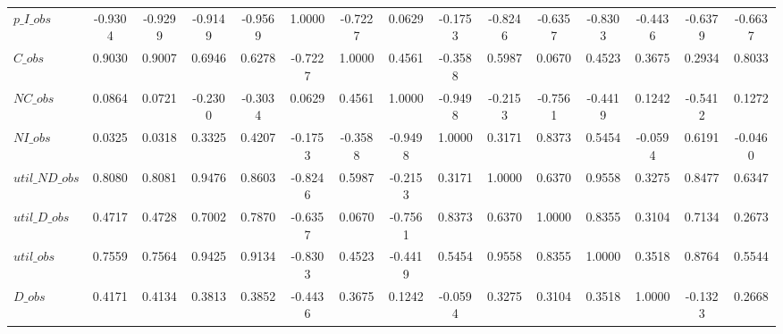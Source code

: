 \begin{center}
\begin{longtable}{lcccccccccccccc}
$p\_I\_obs      $	 & 	          -0.9304	 & 	          -0.9299	 & 	          -0.9149	 & 	          -0.9569	 & 	           1.0000	 & 	          -0.7227	 & 	           0.0629	 & 	          -0.1753	 & 	          -0.8246	 & 	          -0.6357	 & 	          -0.8303	 & 	          -0.4436	 & 	          -0.6379	 & 	          -0.6637 \\ 
$C\_obs         $	 & 	           0.9030	 & 	           0.9007	 & 	           0.6946	 & 	           0.6278	 & 	          -0.7227	 & 	           1.0000	 & 	           0.4561	 & 	          -0.3588	 & 	           0.5987	 & 	           0.0670	 & 	           0.4523	 & 	           0.3675	 & 	           0.2934	 & 	           0.8033 \\ 
$NC\_obs        $	 & 	           0.0864	 & 	           0.0721	 & 	          -0.2300	 & 	          -0.3034	 & 	           0.0629	 & 	           0.4561	 & 	           1.0000	 & 	          -0.9498	 & 	          -0.2153	 & 	          -0.7561	 & 	          -0.4419	 & 	           0.1242	 & 	          -0.5412	 & 	           0.1272 \\ 
$NI\_obs        $	 & 	           0.0325	 & 	           0.0318	 & 	           0.3325	 & 	           0.4207	 & 	          -0.1753	 & 	          -0.3588	 & 	          -0.9498	 & 	           1.0000	 & 	           0.3171	 & 	           0.8373	 & 	           0.5454	 & 	          -0.0594	 & 	           0.6191	 & 	          -0.0460 \\ 
$util\_ND\_obs  $	 & 	           0.8080	 & 	           0.8081	 & 	           0.9476	 & 	           0.8603	 & 	          -0.8246	 & 	           0.5987	 & 	          -0.2153	 & 	           0.3171	 & 	           1.0000	 & 	           0.6370	 & 	           0.9558	 & 	           0.3275	 & 	           0.8477	 & 	           0.6347 \\ 
$util\_D\_obs   $	 & 	           0.4717	 & 	           0.4728	 & 	           0.7002	 & 	           0.7870	 & 	          -0.6357	 & 	           0.0670	 & 	          -0.7561	 & 	           0.8373	 & 	           0.6370	 & 	           1.0000	 & 	           0.8355	 & 	           0.3104	 & 	           0.7134	 & 	           0.2673 \\ 
$util\_obs      $	 & 	           0.7559	 & 	           0.7564	 & 	           0.9425	 & 	           0.9134	 & 	          -0.8303	 & 	           0.4523	 & 	          -0.4419	 & 	           0.5454	 & 	           0.9558	 & 	           0.8355	 & 	           1.0000	 & 	           0.3518	 & 	           0.8764	 & 	           0.5544 \\ 
$D\_obs         $	 & 	           0.4171	 & 	           0.4134	 & 	           0.3813	 & 	           0.3852	 & 	          -0.4436	 & 	           0.3675	 & 	           0.1242	 & 	          -0.0594	 & 	           0.3275	 & 	           0.3104	 & 	           0.3518	 & 	           1.0000	 & 	          -0.1323	 & 	           0.2668 \\ 

\end{longtable}
\end{center}
